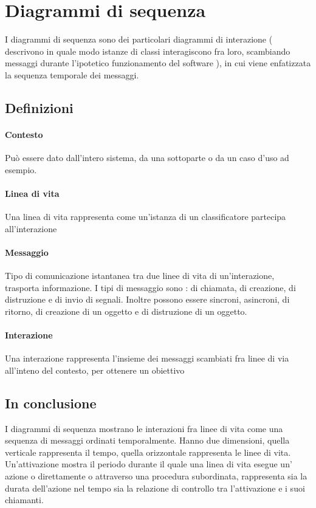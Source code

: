 \documentclass[a4paper,12pt]{report}
\begin{document}
	\section{Diagrammi di sequenza}
	I diagrammi di sequenza sono dei particolari diagrammi di interazione ( descrivono in quale modo istanze di classi interagiscono fra loro, scambiando messaggi durante l'ipotetico funzionamento del software ), in cui viene enfatizzata la sequenza temporale dei messaggi.
	\subsection{Definizioni}
	\paragraph{Contesto} Può essere dato dall'intero sistema, da una sottoparte o da un caso d'uso ad esempio.
	\paragraph{Linea di vita} Una linea di vita rappresenta come un'istanza di un classificatore partecipa all'interazione
	\paragraph{Messaggio} Tipo di comunicazione istantanea tra due linee di vita di un'interazione, trasporta informazione. I tipi di messaggio sono : di chiamata, di creazione, di distruzione e di invio di segnali. Inoltre possono essere sincroni, asincroni, di ritorno, di creazione di un oggetto e di distruzione di un oggetto.
	\paragraph{Interazione} Una interazione rappresenta l'insieme dei messaggi scambiati fra linee di via all'inteno del contesto, per ottenere un obiettivo
	\subsection{In conclusione}
	I diagrammi di sequenza mostrano le interazioni fra linee di vita come una sequenza di messaggi ordinati temporalmente. Hanno due dimensioni, quella verticale rappresenta il tempo, quella orizzontale rappresenta le linee di vita. Un'attivazione mostra il periodo durante il quale una linea di vita esegue  un' azione o direttamente o attraverso una procedura subordinata, rappresenta sia la durata dell'azione nel tempo sia la relazione di controllo tra l'attivazione e i suoi chiamanti.
\end{document}
